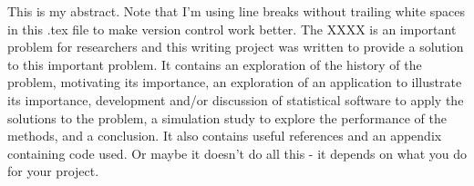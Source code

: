 This is my abstract. Note that I'm using line breaks without trailing white spaces in this .tex file to
make version control work better. The XXXX is an important problem for researchers and this writing
project was written to provide a solution to this important problem. It contains an exploration
of the history of the problem, motivating its importance, an exploration of an application to
illustrate its importance, development and/or discussion of statistical software to apply
the solutions to the problem, a simulation study to explore the performance of the methods,
and a conclusion. It also contains useful references and an appendix containing code used.
Or maybe it doesn't do all this - it depends on what you do for your project.
